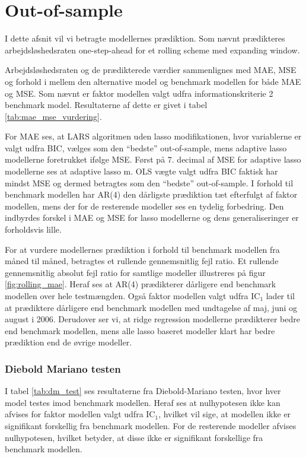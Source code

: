 \chapter{Out-of-sample}
I dette afsnit vil vi betragte modellernes prædiktion.
Som nævnt prædikteres arbejdsløshedsraten one-step-ahead for et rolling scheme med expanding window.

Arbejdsløshedsraten og de prædikterede værdier sammenlignes med MAE, MSE og forhold i mellem den alternative model og benchmark modellen for både MAE og MSE.
Som nævnt er faktor modellen valgt udfra informationskriterie 2 benchmark model.
Resultaterne af dette er givet i tabel \ref{tab:mae_mse_vurdering}.
%


For MAE ses, at LARS algoritmen uden lasso modifikationen, hvor variablerne er valgt udfra BIC, vælges som den ``bedste'' out-of-sample, mens adaptive lasso modellerne foretrukket
ifølge MSE.
Først på 7. decimal af MSE for adaptive lasso modellerne ses at adaptive lasso m. OLS vægte valgt udfra BIC faktisk har mindst MSE og dermed betragtes som den ``bedste'' out-of-sample.
I forhold til benchmark modellen har AR(4) den dårligste prædiktion tæt efterfulgt af faktor modellen, mens der for de resterende modeller ses en tydelig forbedring.
Den indbyrdes forskel i MAE og MSE for lasso modellerne og dens generaliseringer er forholdsvis lille.

For at vurdere modellernes prædiktion i forhold til benchmark modellen fra måned til måned, betragtes et rullende gennemsnitlig fejl ratio.
Et rullende gennemsnitlig absolut fejl ratio for samtlige modeller illustreres på figur \ref{fig:rolling_mae}.
Heraf ses at AR(4) prædikterer dårligere end benchmark modellen over hele testmængden.
Også faktor modellen valgt udfra IC$_1$ lader til at prædiktere dårligere end benchmark modellen med undtagelse af maj, juni og august i 2006.
Derudover ser vi, at ridge regression modellerne prædikterer bedre end benchmark modellen, mens alle lasso baseret modeller klart har bedre prædiktion end de øvrige modeller.
%
%

%
%

\subsection{Diebold Mariano testen}
I tabel \ref{tab:dm_test} ses resultaterne fra Diebold-Mariano testen, hvor hver model testes imod benchmark modellen.
Heraf ses at nulhypotesen ikke kan afvises for faktor modellen valgt udfra IC\(_1\), hvilket vil sige, at modellen ikke er signifikant forskellig fra benchmark modellen.
For de resterende modeller afvises nulhypotesen, hvilket betyder, at disse ikke er signifikant forskellige fra benchmark modellen.
%

%
\newpage
